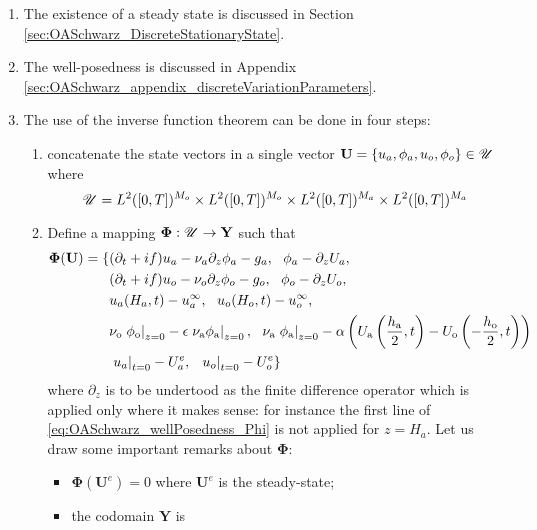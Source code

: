 \begin{enumerate}
	\item The existence of a steady state is discussed in
	Section \ref{sec:OASchwarz_DiscreteStationaryState}.
	\item The well-posedness is discussed in Appendix
	\ref{sec:OASchwarz_appendix_discreteVariationParameters}.
	\item The use of the inverse function theorem can be
		done in four steps:
	\begin{enumerate}
		\item concatenate the state vectors
			in a single vector $\mathbf{U}=
		\{u_a, \phi_a, u_o, \phi_o\} \in \mathbf{\cal U}$
		where
		\begin{equation}
			\mathbf{\cal U} = L^2([0,T])^{M_o} \times
			L^2([0,T])^{M_o} \times L^2([0,T])^{M_a}
			\times L^2([0,T])^{M_a}
		\end{equation}
		\item
		Define a mapping
		$\mathbf{\Phi}: \mathbf{\cal U}\rightarrow \mathbf{Y}$
		such that
\begin{equation}
	\label{eq:OASchwarz_wellPosedness_Phi}
\begin{aligned}
	\mathbf{\Phi}(\mathbf{U}) =
	\{&(\partial_t + if) u_a - \nu_a\partial_z \phi_a - g_a, ~~
	\phi_a-\partial_z U_a, \\
	&(\partial_t + if) u_o - \nu_o\partial_z \phi_o - g_o,
	 ~~ \phi_o-\partial_z U_o, \\
	&u_a(H_a, t) - u^\infty_a, ~~ u_o(H_o, t) - u^\infty_o, \\
	&\nu_{\rm o}\left.\phi_{\rm o}\right|_{z=0} -
	\epsilon \left.\nu_{\rm a}\phi_{\rm a}\right|_{z=0}, ~~
	\nu_{\rm a}\left.\phi_{\rm a}\right|_{z=0} - \alpha
	\left( U_{\rm a}\left(\frac{h_{\rm a}}{2},
	t\right) - U_{\rm o}\left(-\frac{h_{\rm o}}{2},
	t\right)\right) \\
	&\left.u_a\right|_{t=0} - U^e_{a}, ~~
	\left.u_o\right|_{t=0} - U^e_{o}\}
\end{aligned}
\end{equation}
where $\partial_z$ is to be undertood as the finite difference
operator which is applied only where it makes sense:
for instance the first line of \eqref{eq:OASchwarz_wellPosedness_Phi}
is not applied for $z=H_a$.
Let us draw some important remarks about $\mathbf{\Phi}$:
\begin{itemize}
 \item $\mathbf{\Phi}(\mathbf{U}^e)=0$
 	where $\mathbf{U}^e$
 	is the steady-state;
 \item the codomain $\mathbf{Y}$ is

\end{itemize}
\end{enumerate}
\end{enumerate}
